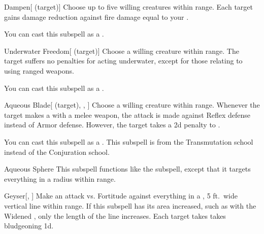 \begin{ability}[\nth{1}]{Dampen}[ (target)]
Choose up to five willing creatures within \rngclose range.
Each target gains damage reduction against fire damage equal to your .

You can cast this subspell as a .
\end{ability}
\vspace{0.25em}


\begin{ability}[\nth{1}]{Underwater Freedom}[ (target)]
Choose a willing creature within \rngclose range.
The target suffers no penalties for acting underwater, except for those relating to using ranged weapons.

You can cast this subspell as a .
\end{ability}
\vspace{0.25em}


\begin{ability}[\nth{2}]{Aqueous Blade}[ (target), , ]
Choose a willing creature within \rngclose range.
Whenever the target makes a  with a melee weapon, the attack is made against Reflex defense instead of Armor defense.
However, the target takes a \minus2d penalty to .

You can cast this subspell as a .
This subspell is from the Transmutation school instead of the Conjuration school.
\end{ability}
\vspace{0.25em}


\begin{ability}[\nth{2}]{Aqueous Sphere}
This subspell functions like the  subspell, except that it targets everything in a \areasmall radius within \rngclose range.
\end{ability}
\vspace{0.25em}


\begin{ability}[\nth{2}]{Geyser}[, ]
Make an attack vs. Fortitude against everything in a \arealarge, 5 ft.\ wide vertical line within \rngmed range.
If this subspell has its area increased, such as with the Widened , only the length of the line increases.
\hit Each target takes takes bludgeoning  \plus1d.
\end{ability}
\vspace{0.25em}


